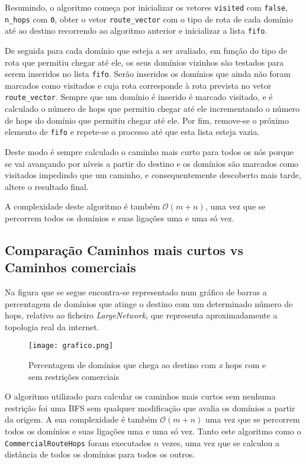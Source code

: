 \documentclass{article}
\begin{document}
Resumindo, o algoritmo começa por inicializar os vetores \texttt{visited} com \texttt{false}, \texttt{n\_hops} com \texttt{0}, obter o vetor \texttt{route\_vector} com o tipo de rota de cada domínio até ao destino recorrendo ao algoritmo anterior e inicializar a lista \texttt{fifo}. 

De seguida para cada domínio que esteja a ser avaliado, em função do tipo de rota que permitiu chegar até ele, os seus domínios vizinhos são testados para serem inseridos no lista \texttt{fifo}. Serão inseridos os domínios que ainda não foram marcados como visitados e cuja rota corresponde à rota prevista no vetor \texttt{route\_vector}. Sempre que um domínio é inserido é marcado visitado, e é calculado o número de hops que permitiu chegar até ele incrementando o número de hops do domínio que permitiu chegar até ele. Por fim, remove-se o próximo elemento de \texttt{fifo} e repete-se o processo até que esta lista esteja vazia.

Deste modo é sempre calculado o caminho mais curto para todos os nós porque se vai avançando por níveis a partir do destino e os domínios são marcados como visitados impedindo que um caminho, e consequentemente descoberto mais tarde, altere o resultado final.

A complexidade deste algoritmo é também $\mathcal{O}(m+n)$, uma vez que se percorrem todos os domínios e suas ligações uma e uma só vez.

\subsection{Comparação Caminhos mais curtos {\small vs} Caminhos comerciais}

Na figura que se segue encontra-se representado num gráfico de barras a percentagem de domínios que atinge o destino com um determinado número de hops, relativo ao ficheiro \textit{LargeNetwork}, que representa aproximadamente a topologia real da internet.

\begin{figure}[H]
	\centering
	\texttt{[image: grafico.png]}
	\caption{Percentagem de domínios que chega ao destino com \textit{x} hops com e sem restrições comerciais}
\end{figure}

O algoritmo utilizado para calcular os caminhos mais curtos sem nenhuma restrição foi uma BFS sem qualquer modificação que avalia os domínios a partir da origem. A sua complexidade é também $\mathcal{O}(m+n)$ uma vez que se percorrem todos os domínios e suas ligações uma e uma só vez. Tanto este algoritmo como o \texttt{CommercialRouteHops} foram executados $n$ vezes, uma vez que se calculou a distância de todos os domínios para todos os outros.
\end{document}
